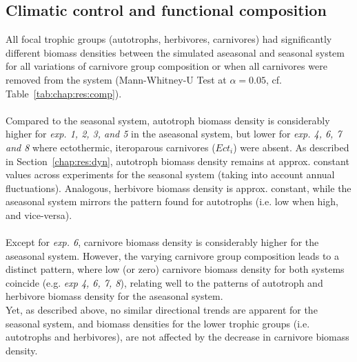 

\subsection{Climatic control and functional composition}
\label{chap:res:diff}
All focal trophic groups (autotrophs, herbivores, carnivores) had significantly different biomass densities between the simulated aseasonal and seasonal system for all variations of carnivore group composition or when all carnivores were removed from the system (Mann-Whitney-U Test at $\alpha = 0.05$, cf. Table~\ref{tab:chap:res:comp}).\\\\

Compared to the seasonal system, autotroph biomass density is considerably higher for \textit{exp. 1, 2, 3, and 5} in the aseasonal system, but lower for \textit{exp. 4, 6, 7 and 8} where ectothermic, iteroparous carnivores ($Ect_i$) were absent. As described in Section~\ref{chap:res:dyn}, autotroph biomass density remains at approx. constant values across experiments for the seasonal system (taking into account annual fluctuations). 
Analogous, herbivore biomass density is approx. constant, while the aseasonal system mirrors the pattern found for autotrophs (i.e. low when high, and vice-versa). \\\\
Except for \textit{exp. 6}, carnivore biomass density is considerably higher for the aseasonal system. 
However, the varying carnivore group composition leads to a distinct pattern, where low (or zero) carnivore biomass density for both systems coincide (e.g. \textit{exp 4, 6, 7, 8}), relating well to the patterns of autotroph and herbivore biomass density for the aseasonal system. \\
Yet, as described above, no similar directional trends are apparent for the seasonal system, and biomass densities for the lower trophic groups (i.e. autotrophs and herbivores), are not affected by the decrease in carnivore biomass density.

